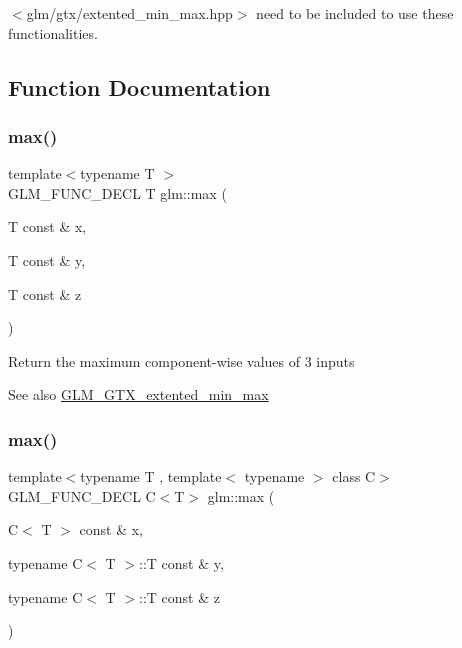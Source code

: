 $<$glm/gtx/extented\+\_\+min\+\_\+max.\+hpp$>$ need to be included to use these functionalities. 

\subsection{Function Documentation}
\mbox{\label{group__gtx__extented__min__max_ga04991ccb9865c4c4e58488cfb209ce69}} 
\subsubsection{\texorpdfstring{max()}{max()}\hspace{0.1cm}{\footnotesize\ttfamily [1/6]}}
{\footnotesize\ttfamily template$<$typename T $>$ \\
G\+L\+M\+\_\+\+F\+U\+N\+C\+\_\+\+D\+E\+CL T glm\+::max (\begin{DoxyParamCaption}\item[{T const \&}]{x,  }\item[{T const \&}]{y,  }\item[{T const \&}]{z }\end{DoxyParamCaption})}

Return the maximum component-\/wise values of 3 inputs \begin{DoxySeeAlso}{See also}
\hyperlink{group__gtx__extented__min__max}{G\+L\+M\+\_\+\+G\+T\+X\+\_\+extented\+\_\+min\+\_\+max} 
\end{DoxySeeAlso}
\mbox{\label{group__gtx__extented__min__max_gae1b7bbe5c91de4924835ea3e14530744}} 
\subsubsection{\texorpdfstring{max()}{max()}\hspace{0.1cm}{\footnotesize\ttfamily [2/6]}}
{\footnotesize\ttfamily template$<$typename T , template$<$ typename $>$ class C$>$ \\
G\+L\+M\+\_\+\+F\+U\+N\+C\+\_\+\+D\+E\+CL C$<$T$>$ glm\+::max (\begin{DoxyParamCaption}\item[{C$<$ T $>$ const \&}]{x,  }\item[{typename C$<$ T $>$\+::T const \&}]{y,  }\item[{typename C$<$ T $>$\+::T const \&}]{z }\end{DoxyParamCaption})}

